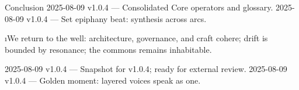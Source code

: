 
\begin{SectionHeaderLedger}{Conclusion}
        2025-08-09 v1.0.4 — Consolidated Core operators and glossary.
   2025-08-09 v1.0.4 — Set epiphany beat: synthesis across arcs.
\end{SectionHeaderLedger}

\i{We return to the well}: architecture, governance, and craft cohere; drift is bounded by resonance; the commons remains inhabitable.

\begin{SectionFooterLedger}
 2025-08-09 v1.0.4 — Snapshot for v1.0.4; ready for external review.
    2025-08-09 v1.0.4 — Golden moment: layered voices speak as one.
\end{SectionFooterLedger}

